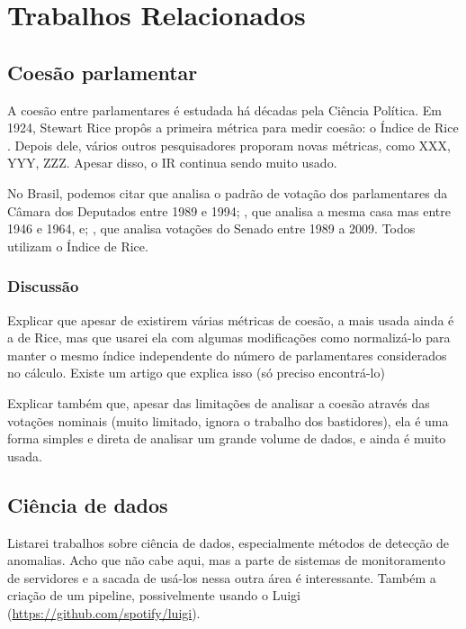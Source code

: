 \chapter{Trabalhos Relacionados}\label{cap:relacionados}


\section{Coesão parlamentar}

A coesão entre parlamentares é estudada há décadas pela Ciência Política. Em 1924, Stewart Rice propôs a primeira métrica para medir coesão: o Índice de Rice \cite{Rice1924}. Depois dele, vários outros pesquisadores proporam novas métricas, como XXX, YYY, ZZZ. Apesar disso, o IR continua sendo muito usado.

No Brasil, podemos citar \cite{Figueiredo1995} que analisa o padrão de votação dos parlamentares da Câmara dos Deputados entre 1989 e 1994; \cite{Neto1997}, que analisa a mesma casa mas entre 1946 e 1964, e; \cite{Robson2011}, que analisa votações do Senado entre 1989 a 2009. Todos utilizam o Índice de Rice.

\subsection{Discussão}

Explicar que apesar de existirem várias métricas de coesão, a mais usada ainda é a de Rice, mas que usarei ela com algumas modificações como normalizá-lo para manter o mesmo índice independente do número de parlamentares considerados no cálculo. Existe um artigo que explica isso (só preciso encontrá-lo)

Explicar também que, apesar das limitações de analisar a coesão através das votações nominais (muito limitado, ignora o trabalho dos bastidores), ela é uma forma simples e direta de analisar um grande volume de dados, e ainda é muito usada.

\section{Ciência de dados}

Listarei trabalhos sobre ciência de dados, especialmente métodos de detecção de anomalias. Acho que não cabe aqui, mas a parte de sistemas de monitoramento de servidores e a sacada de usá-los nessa outra área é interessante. Também a criação de um pipeline, possivelmente usando o Luigi (\url{https://github.com/spotify/luigi}).



